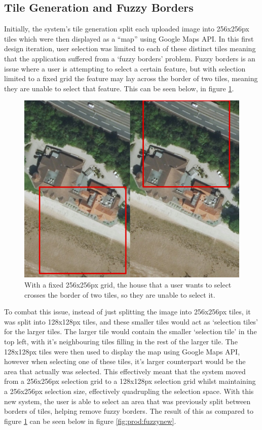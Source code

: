 \subsection{Tile Generation and Fuzzy Borders} \label{section:fuzzy}
Initially, the system’s tile generation split each uploaded image into 256x256px tiles which were then displayed as a “map” using Google Maps API. In this first design iteration, user selection was limited to each of these distinct tiles meaning that the application suffered from a ‘fuzzy borders’ problem. Fuzzy borders is an issue where a user is attempting to select a certain feature, but with selection limited to a fixed grid the feature may lay across the border of two tiles, meaning they are unable to select that feature. This can be seen below, in figure \ref{fig:prod:fuzzyold}.


\begin{figure}[H]
    \centering
    \includegraphics[width=\textwidth]{figs/6/fuzzy-old}
    \caption{With a fixed 256x256px grid, the house that a user wants to select crosses the border of two tiles, so they are unable to select it.}
    \label{fig:prod:fuzzyold}
\end{figure}

To combat this issue, instead of just splitting the image into 256x256px tiles, it was split into 128x128px tiles, and these smaller tiles would act as `selection tiles’ for the larger tiles. The larger tile would contain the smaller `selection tile’ in the top left, with it’s neighbouring tiles filling in the rest of the larger tile. The 128x128px tiles were then used to display the map using Google Maps API, however when selecting one of these tiles, it’s larger counterpart would be the area that actually was selected. This effectively meant that the system moved from a 256x256px selection grid to a 128x128px selection grid whilst maintaining a 256x256px selection size, effectively quadrupling the selection space. With this new system, the user is able to select an area that was previously split between borders of tiles, helping remove fuzzy borders. The result of this as compared to figure \ref{fig:prod:fuzzyold} can be seen below in figure \ref{fig:prod:fuzzynew}.

